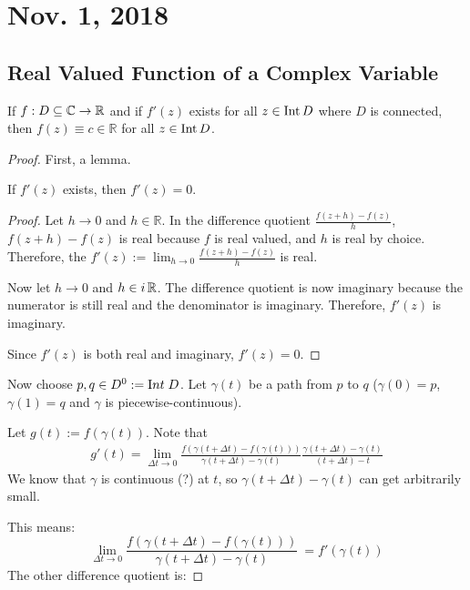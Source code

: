 \documentclass[notes]{subfile}
\begin{document}
\section{Nov. 1, 2018}
\subsection{Real Valued Function of a Complex Variable}

\begin{theorem}
    If $f:D \subseteq \operatorname{\mathbb{C}} \to \operatorname{\mathbb{R}}$ and if $f'(z)$ exists for all $z \in \operatorname{Int}{D}$ where $D$ is connected, then $f(z) \equiv c \in \mathbb{R}$ for all $z \in \operatorname{Int}{D}$.
\end{theorem}

\begin{proof}
First, a lemma.
    \begin{lemma}
        If $f'(z)$ exists, then $f'(z) = 0$.
    \end{lemma}

    \begin{proof}
        Let $h \to 0$ and $h \in \mathbb{R}$.
        In the difference quotient $\frac{f(z+h)-f(z)}{h}$, 
        $f(z+h) - f(z)$ is real because $f$ is real valued, 
        and $h$ is real by choice.
        Therefore, the $f'(z) := \lim_{h \to 0} \frac{f(z+h) - f(z)}{h}$ is real.

        Now let $h \to 0$ and $h \in i\operatorname{\mathbb{R}}$.  
        The difference quotient is now imaginary because the numerator is still real and the denominator is imaginary.
        Therefore, $f'(z)$ is imaginary.

        Since $f'(z)$ is both real and imaginary, $f'(z) = 0$.
    \end{proof}

    Now choose $p,q \in D^0 := {\text Int}\; D$.
    Let $\gamma(t)$ be a path from $p$ to $q$ ($\gamma(0) = p$, $\gamma(1) =q$ and $\gamma$ is piecewise-continuous).
    
    Let $g(t) := f(\gamma(t))$.
    Note that
    \begin{align*}
        g'(t) = \lim_{\Delta t \to 0} \frac{f(\gamma(t+\Delta t) - f(\gamma(t)))}{\gamma(t + \Delta t) - \gamma(t)}\frac{\gamma(t + \Delta t) - \gamma(t)}{(t + \Delta t) - t} 
    \end{align*}
    We know that $\gamma$ is continuous (?) at $t$, so $\gamma(t+\Delta t) - \gamma(t)$ can get arbitrarily small.

    This means:
    \[\lim_{\Delta t \to 0} \frac{f(\gamma(t+\Delta t) - f(\gamma(t)))}{\gamma(t + \Delta t) - \gamma(t)}\ = f'(\gamma(t)) \]
    The other difference quotient is:


\end{proof}
\end{document}
